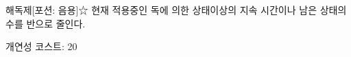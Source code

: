 \documentclass{report}
\begin{document}
	\begin{story}{해독제}{[포션: 음용]☆}
		현재 적용중인 독에 의한 상태이상의 지속 시간이나 남은 상태의 수를 반으로 줄인다.
		
		개연성 코스트: 20
	\end{story}
\end{document}
